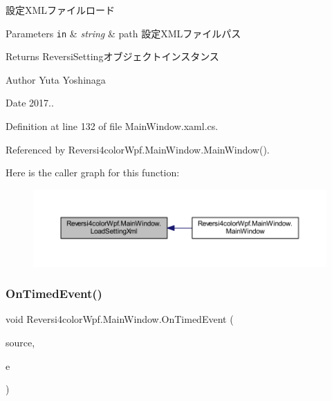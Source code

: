 設定\+X\+M\+Lファイルロード 


\begin{DoxyParams}[1]{Parameters}
\mbox{\tt in}  & {\em string} & path 設定\+X\+M\+Lファイルパス \\
\hline
\end{DoxyParams}
\begin{DoxyReturn}{Returns}
Reversi\+Settingオブジェクトインスタンス 
\end{DoxyReturn}
\begin{DoxyAuthor}{Author}
Yuta Yoshinaga 
\end{DoxyAuthor}
\begin{DoxyDate}{Date}
2017.. 
\end{DoxyDate}


Definition at line 132 of file Main\+Window.\+xaml.\+cs.



Referenced by Reversi4color\+Wpf.\+Main\+Window.\+Main\+Window().

Here is the caller graph for this function\+:
\nopagebreak
\begin{figure}[H]
\begin{center}
\leavevmode
\includegraphics[width=350pt]{class_reversi4color_wpf_1_1_main_window_a41e46cabc1f4610366e617af1ad95805_icgraph}
\end{center}
\end{figure}
\mbox{\label{class_reversi4color_wpf_1_1_main_window_a393b6648bbb8d33ff0cee0839a520de4}} 
\subsubsection{\texorpdfstring{On\+Timed\+Event()}{OnTimedEvent()}}
{\footnotesize\ttfamily void Reversi4color\+Wpf.\+Main\+Window.\+On\+Timed\+Event (\begin{DoxyParamCaption}\item[{object}]{source,  }\item[{Elapsed\+Event\+Args}]{e }\end{DoxyParamCaption})\hspace{0.3cm}{\ttfamily [private]}}



